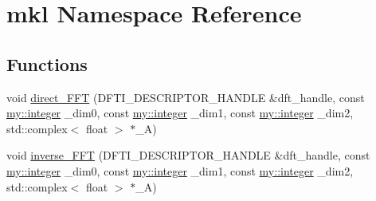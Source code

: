 \hypertarget{namespacemkl}{\section{mkl Namespace Reference}
\label{namespacemkl}
}
\subsection*{Functions}
\begin{DoxyCompactItemize}
\item 
void \hyperlink{namespacemkl_a122f328e6079ba392e8a44c1de72ca7f}{direct\+\_\+\+F\+F\+T} (D\+F\+T\+I\+\_\+\+D\+E\+S\+C\+R\+I\+P\+T\+O\+R\+\_\+\+H\+A\+N\+D\+L\+E \&dft\+\_\+handle, const \hyperlink{namespacemy_a42365393c537edae1e89d20ff90d1923}{my\+::integer} \+\_\+dim0, const \hyperlink{namespacemy_a42365393c537edae1e89d20ff90d1923}{my\+::integer} \+\_\+dim1, const \hyperlink{namespacemy_a42365393c537edae1e89d20ff90d1923}{my\+::integer} \+\_\+dim2, std\+::complex$<$ float $>$ $\ast$\+\_\+\+A)
\item 
void \hyperlink{namespacemkl_ad2c0764c53d2daac345314013c579080}{inverse\+\_\+\+F\+F\+T} (D\+F\+T\+I\+\_\+\+D\+E\+S\+C\+R\+I\+P\+T\+O\+R\+\_\+\+H\+A\+N\+D\+L\+E \&dft\+\_\+handle, const \hyperlink{namespacemy_a42365393c537edae1e89d20ff90d1923}{my\+::integer} \+\_\+dim0, const \hyperlink{namespacemy_a42365393c537edae1e89d20ff90d1923}{my\+::integer} \+\_\+dim1, const \hyperlink{namespacemy_a42365393c537edae1e89d20ff90d1923}{my\+::integer} \+\_\+dim2, std\+::complex$<$ float $>$ $\ast$\+\_\+\+A)
\end{DoxyCompactItemize}


